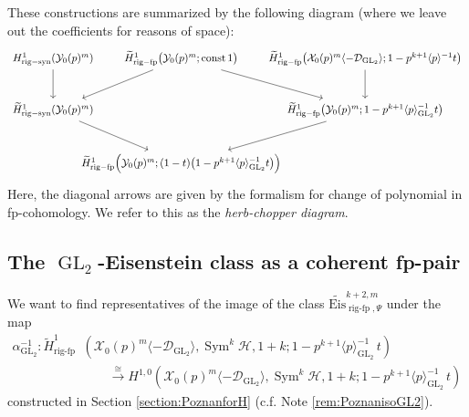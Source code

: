\documentclass[cjm]{ipart}
\theoremstyle{plain}
\theoremstyle{remark}
\DeclareMathOperator{\GL}{GL}
\DeclareMathOperator{\rigfp}{rig-fp}
\DeclareMathOperator{\rigsyn}{rig-syn}
\DeclareMathOperator{\Sym}{Sym}
\newcommand{\Eis}{\mathrm{Eis}}
\newcommand{\cD}{\mathcal{D}}
\newcommand{\cX}{\mathcal{X}}
\newcommand{\cY}{\mathcal{Y}}
\newcommand{\sH}{\mathscr{H}}
\newcommand{\wH}{\widetilde{H}}
\numberwithin{equation}{subsection}
\begin{document}
\begin{remark}\label{rem:herbchopper}
 These constructions are summarized by the following diagram (where we leave out the coefficients for reasons of space):
 \[
 \begin{tikzcd}[row sep=large, column sep=-2em]
 H^1_{\rigsyn}(\cY_0(p)^{m})
   \arrow[d]
 &
 \wH^1_{\rigfp}\big(\cY_0(p)^{m}; \operatorname{const} 1\big)
   \arrow[dl]
   \arrow[dr]
 &
 \wH^1_{\rigfp}\big(\cX_0(p)^{m}\langle -\cD_{\GL_2}\rangle; 1-p^{k+1}\langle p \rangle^{-1} t\big)
   \arrow[d]
 \\
 \wH^1_{\rigsyn}(\cY_0(p)^{m})
 \arrow[dr]
 &
 &
 \wH^1_{\rigfp}\big(\cY_0(p)^{m}; 1-p^{k+1}\langle p \rangle_{\GL_2}^{-1} t\big)
   \arrow[dl]
 \\
 &
 \wH^1_{\rigfp}\Big(\cY_0(p)^{m}; (1-t)\big(1-p^{k+1}\langle p\rangle_{\GL_2}^{-1} t\big)\Big)
 \end{tikzcd}
 \]
% 
% 
 Here, the diagonal arrows are given by the formalism for change of polynomial in fp-cohomology. We refer to this as the \emph{herb-chopper diagram}.
\end{remark}






\subsection{The $\GL_2$-Eisenstein class as a coherent fp-pair}

We want to find representatives of the image of the class $\widetilde{\Eis}_{\rigfp,\Psi}^{k+2,m}$ under the map
\begin{align*}
 \alpha_{\GL_2}^{-1}: \wH^1_{\rigfp}&\left(\cX_0(p)^{m}\langle -\cD_{\GL_2}\rangle, \Sym^k\sH,1+k;1-p^{k+1}\langle p \rangle^{-1}_{\GL_2}\, t\right) \\
 &\qquad \xrightarrow{\ \cong\ } H^{1,0}\left(\cX_0(p)^{m}\langle -\cD_{\GL_2}\rangle,\Sym^k\sH,1+k;1-p^{k+1}\langle p \rangle^{-1}_{\GL_2}\, t\right)
\end{align*}
constructed in Section \ref{section:PoznanforH} (c.f. Note \ref{rem:PoznanisoGL2}).
\end{document}
